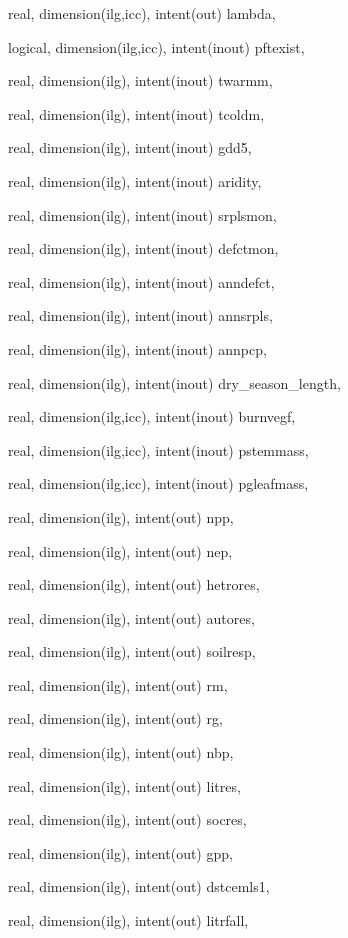 {\begin{DoxyParamCaption}
\item[{real, dimension(ilg,icc), intent(out)}]{lambda, }
\item[{logical, dimension(ilg,icc), intent(inout)}]{pftexist, }
\item[{real, dimension(ilg), intent(inout)}]{twarmm, }
\item[{real, dimension(ilg), intent(inout)}]{tcoldm, }
\item[{real, dimension(ilg), intent(inout)}]{gdd5, }
\item[{real, dimension(ilg), intent(inout)}]{aridity, }
\item[{real, dimension(ilg), intent(inout)}]{srplsmon, }
\item[{real, dimension(ilg), intent(inout)}]{defctmon, }
\item[{real, dimension(ilg), intent(inout)}]{anndefct, }
\item[{real, dimension(ilg), intent(inout)}]{annsrpls, }
\item[{real, dimension(ilg), intent(inout)}]{annpcp, }
\item[{real, dimension(ilg), intent(inout)}]{dry\+\_\+season\+\_\+length, }
\item[{real, dimension(ilg,icc), intent(inout)}]{burnvegf, }
\item[{real, dimension(ilg,icc), intent(inout)}]{pstemmass, }
\item[{real, dimension(ilg,icc), intent(inout)}]{pgleafmass, }
\item[{real, dimension(ilg), intent(out)}]{npp, }
\item[{real, dimension(ilg), intent(out)}]{nep, }
\item[{real, dimension(ilg), intent(out)}]{hetrores, }
\item[{real, dimension(ilg), intent(out)}]{autores, }
\item[{real, dimension(ilg), intent(out)}]{soilresp, }
\item[{real, dimension(ilg), intent(out)}]{rm, }
\item[{real, dimension(ilg), intent(out)}]{rg, }
\item[{real, dimension(ilg), intent(out)}]{nbp, }
\item[{real, dimension(ilg), intent(out)}]{litres, }
\item[{real, dimension(ilg), intent(out)}]{socres, }
\item[{real, dimension(ilg), intent(out)}]{gpp, }
\item[{real, dimension(ilg), intent(out)}]{dstcemls1, }
\item[{real, dimension(ilg), intent(out)}]{litrfall, }

\end{DoxyParamCaption}}

